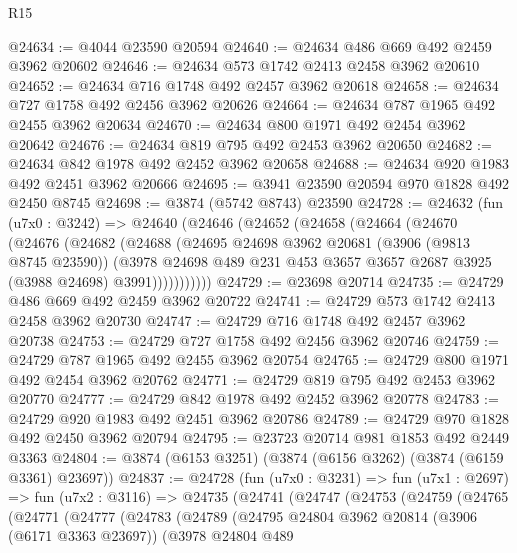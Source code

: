 \begin{lexlean}{R15}
\begin{coremodule}
@24634 := @4044 @23590 @20594
@24640 := @24634 @486 @669 @492 @2459 @3962 @20602
@24646 := @24634 @573 @1742 @2413 @2458 @3962 @20610
@24652 := @24634 @716 @1748 @492 @2457 @3962 @20618
@24658 := @24634 @727 @1758 @492 @2456 @3962 @20626
@24664 := @24634 @787 @1965 @492 @2455 @3962 @20634
@24670 := @24634 @800 @1971 @492 @2454 @3962 @20642
@24676 := @24634 @819 @795 @492 @2453 @3962 @20650
@24682 := @24634 @842 @1978 @492 @2452 @3962 @20658
@24688 := @24634 @920 @1983 @492 @2451 @3962 @20666
@24695 := @3941 @23590 @20594 @970 @1828 @492 @2450 @8745
@24698 := @3874 (@5742 @8743) @23590
@24728 := @24632
    (fun (u7x0 : @3242) =>
    @24640
      (@24646
        (@24652
          (@24658
            (@24664
              (@24670
                (@24676
                  (@24682
                    (@24688
                      (@24695
                        @24698
                        @3962
                        @20681
                        (@3906 (@9813 @8745 @23590))
                        (@3978
                          @24698
                          @489
                          @231
                          @453
                          @3657
                          @3657
                          @2687
                          @3925
                          (@3988 @24698)
                          @3991)))))))))))
@24729 := @23698 @20714
@24735 := @24729 @486 @669 @492 @2459 @3962 @20722
@24741 := @24729 @573 @1742 @2413 @2458 @3962 @20730
@24747 := @24729 @716 @1748 @492 @2457 @3962 @20738
@24753 := @24729 @727 @1758 @492 @2456 @3962 @20746
@24759 := @24729 @787 @1965 @492 @2455 @3962 @20754
@24765 := @24729 @800 @1971 @492 @2454 @3962 @20762
@24771 := @24729 @819 @795 @492 @2453 @3962 @20770
@24777 := @24729 @842 @1978 @492 @2452 @3962 @20778
@24783 := @24729 @920 @1983 @492 @2451 @3962 @20786
@24789 := @24729 @970 @1828 @492 @2450 @3962 @20794
@24795 := @23723 @20714 @981 @1853 @492 @2449 @3363
@24804 := @3874 (@6153 @3251) (@3874 (@6156 @3262) (@3874 (@6159 @3361) @23697))
@24837 := @24728
    (fun (u7x0 : @3231) =>
    fun (u7x1 : @2697) =>
    fun (u7x2 : @3116) =>
    @24735
      (@24741
        (@24747
          (@24753
            (@24759
              (@24765
                (@24771
                  (@24777
                    (@24783
                      (@24789
                        (@24795
                          @24804
                          @3962
                          @20814
                          (@3906 (@6171 @3363 @23697))
                          (@3978
                            @24804
                            @489

\end{coremodule}
\end{lexlean}
